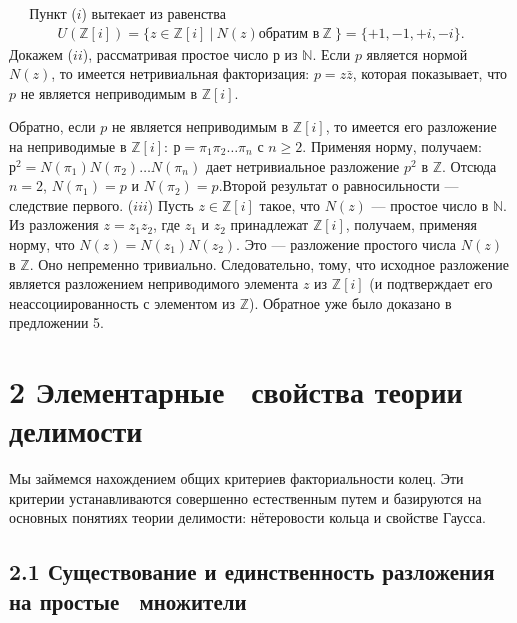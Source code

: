 \documentclass{../../template/mai_book}
\begin{document}
\begin{myproof}
$\;\;\;\;$ Пункт ($i$) вытекает из равенства
\begin{align*}
U(\mathds{Z}[i]) = \{z \in \mathds{Z}[i]\:|\:N(z) \text{обратим в}\:\mathds{Z}\:\} = \{+1,-1,+i,-i\}\text{.}
\end{align*}
\indent Докажем ($ii$), рассматривая простое число $р$ из $\mathds{N}$. Если $p$ является нормой $N(z)$, то имеется нетривиальная факторизация: $p = z\bar{z}$, которая показывает, что $p$ не является неприводимым в $\mathds{Z}[i]$.

\newpage

Обратно, если $p$ не является неприводимым в $\mathds{Z}[i]$, то имеется его разложение на неприводимые в $\mathds{Z}[i]:\:р = \pi_1 \pi_2 \dots \pi_n$ с $n \geqslant 2$. Применяя норму, получаем: $р^2 = N(\pi_1) N(\pi_2) \dots N(\pi_n)$ дает нетривиальное разложение $p^2$ в $\mathds{Z}$. Отсюда $n = 2$, $N(\pi_1) = p$ и $N(\pi_2) = p$.\newline \indent Второй результат о равносильности — следствие первого. \newline \indent ($iii$) Пусть $z \in \mathds{Z}[i]$ такое, что $N(z)$ — простое число в $\mathds{N}$. Из разложения $z = z_1 z_2$, где $z_1$ и $z_2$ принадлежат $\mathds{Z}[i]$, получаем, применяя норму, что $N(z) = N(z_1 ) N(z_2 )$. Это — разложение простого числа $N(z)$ в $\mathds{Z}$. Оно непременно тривиально. Следовательно, тому, что исходное разложение является разложением неприводимого элемента $z$ из $\mathds{Z}[i]$ (и подтверждает его неассоциированность с элементом из $\mathds{Z}$). Обратное уже было доказано в предложении 5.
\end{myproof}

\section{\large{2 Элементарные~ свойства теории~ делимости}}

Мы займемся нахождением общих критериев факториальности колец. Эти критерии устанавливаются совершенно естественным путем и ба­зируются на основных понятиях теории делимости: нётеровости кольца и свойстве Гаусса.

\subsection{2.1 Существование и единственность разложения на \newline простые~ множители}
\end{document}
